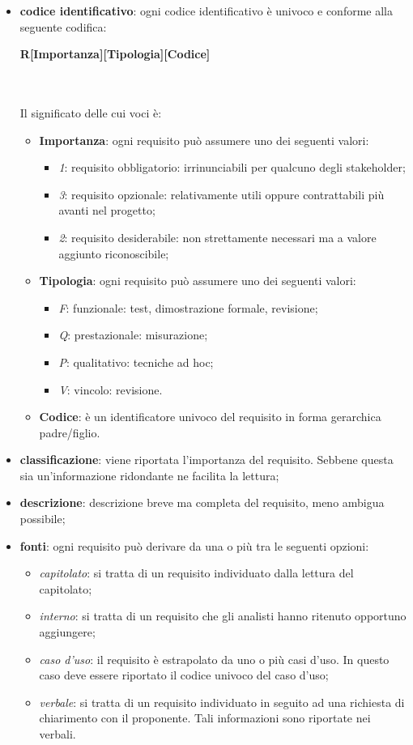 			\begin{itemize}
				\item \textbf{codice identificativo}: ogni codice identificativo è univoco e conforme alla seguente codifica: \\
				\centerline{\textbf{R[Importanza][Tipologia][Codice]}} \\ \\
				Il significato delle cui voci è:
				\begin{itemize}
					\item \textbf{Importanza}: ogni requisito può assumere uno dei seguenti valori:
					\begin{itemize}
						\item \textit{1}: requisito obbligatorio: irrinunciabili per qualcuno degli stakeholder;
						\item \textit{3}: requisito opzionale: relativamente utili oppure contrattabili più avanti nel progetto;
						\item \textit{2}: requisito desiderabile: non strettamente necessari ma  a valore aggiunto riconoscibile;	
					\end{itemize}
					\item \textbf{Tipologia}: ogni requisito può assumere uno dei seguenti valori:
					\begin{itemize}
						\item \textit{F}: funzionale: test, dimostrazione formale, revisione;
						\item \textit{Q}: prestazionale: misurazione;
						\item \textit{P}: qualitativo: tecniche ad hoc;
						\item \textit{V}: vincolo: revisione.
					\end{itemize}
					\item \textbf{Codice}: è un identificatore univoco del requisito in forma gerarchica padre/figlio.
				\end{itemize}
				\item \textbf{classificazione}: viene riportata l'importanza del requisito. Sebbene questa sia un'informazione ridondante ne facilita la lettura;
				\item \textbf{descrizione}: descrizione breve ma completa del requisito, meno ambigua possibile;
				\item \textbf{fonti}: ogni requisito può derivare da una o più tra le seguenti opzioni:
				\begin{itemize}
					\item \textit{capitolato}: si tratta di un requisito individuato dalla lettura del capitolato;
					\item \textit{interno}: si tratta di un requisito che gli analisti hanno ritenuto opportuno aggiungere;
					\item \textit{caso d'uso}: il requisito è estrapolato da uno o più casi d'uso. In questo caso deve essere riportato il codice univoco del caso d'uso;
					\item \textit{verbale}: si tratta di un requisito individuato in seguito ad una richiesta di chiarimento con il proponente. Tali informazioni sono riportate nei verbali.
				\end{itemize}
			\end{itemize}

